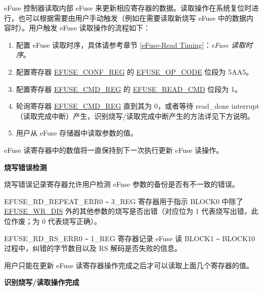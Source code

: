 \documentclass[main\_\_CN.tex]{subfiles}
\begin{document}
eFuse 控制器读取内部 eFuse 来更新相应寄存器的数据。读取操作在系统复位时进行，也可以根据需要由用户手动触发（例如在需要读取新烧写 eFuse 中的数据内容时）。用户触发 eFuse 读取操作的流程如下：
\begin{enumerate}
    \item 配置 eFuse 读取时序，具体请参考章节 \ref{eFuse-Read Timing}：\textit{eFuse
读取时序}。
    \item 配置寄存器 \hyperref[regdesc:EFUSECONFREG]{EFUSE\_CONF\_REG} 的 \hyperref[fielddesc:EFUSEOPCODE]{EFUSE\_OP\_CODE} 位段为 \hexprefix{}5AA5。
    \item 配置寄存器 \hyperref[regdesc:EFUSECMDREG]{EFUSE\_CMD\_REG} 的 \hyperref[fielddesc:EFUSEREADCMD]{EFUSE\_READ\_CMD} 位段为 1。
    \item 轮询寄存器 \hyperref[regdesc:EFUSECMDREG]{EFUSE\_CMD\_REG} 直到其为 \hexprefix{}0，或者等待 read\_done interrupt（读取完成中断）产生，识别烧写/读取完成中断产生的方法详见下方说明。
    \item 用户从 eFuse 存储器中读取参数的值。
\end{enumerate}
eFuse 读寄存器中的数值将一直保持到下一次执行更新 eFuse 读操作。

{\bfseries 烧写错误检测}

烧写错误记录寄存器允许用户检测 eFuse 参数的备份是否有不一致的错误。

EFUSE\_RD\_REPEAT\_ERR0 \verb+~+ 3\_REG 寄存器用于指示 BLOCK0 中除了 \hyperref[fielddesc:EFUSEWRDIS]{EFUSE\_WR\_DIS} 外的其他参数的烧写是否出错（对应位为 1 代表烧写出错，此位作废；为 0 代表烧写正确）。

EFUSE\_RD\_RS\_ERR0 \verb+~+ 1\_REG 寄存器记录 eFuse 读 BLOCK1 \verb+~+ BLOCK10 过程中，纠错的字节数目以及 RS 解码是否失败的信息。

用户只能在更新 eFuse 读寄存器操作完成之后才可以读取上面几个寄存器的值。

{\bfseries 识别烧写/读取操作完成}\label{tip:program and read done interrupt}
\end{document}
